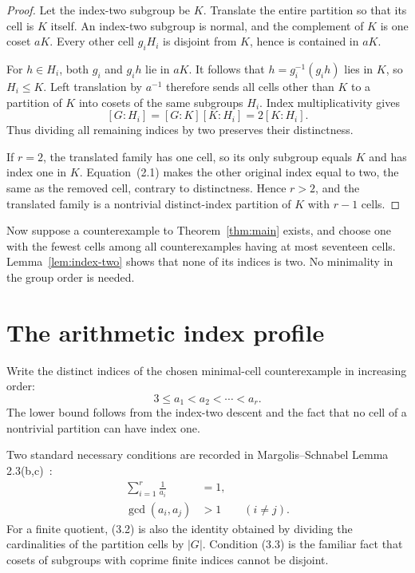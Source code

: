 \documentclass[11pt]{article}
\theoremstyle{definition}
\begin{document}
\begin{proof}
Let the index-two subgroup be $K$. Translate the entire partition so that its
cell is $K$ itself. An index-two subgroup is normal, and the complement of
$K$ is one coset $aK$. Every other cell $g_iH_i$ is disjoint from $K$, hence
is contained in $aK$.

For $h\in H_i$, both $g_i$ and $g_ih$ lie in $aK$. It follows that
$h=g_i^{-1}(g_ih)$ lies in $K$, so $H_i\leq K$. Left translation by $a^{-1}$
therefore sends all cells other than $K$ to a partition of $K$ into cosets of
the same subgroups $H_i$. Index multiplicativity gives
\[
  [G:H_i]=[G:K][K:H_i]=2[K:H_i].
  \tag{2.1}
\]
Thus dividing all remaining indices by two preserves their distinctness.

If $r=2$, the translated family has one cell, so its only subgroup equals
$K$ and has index one in $K$. Equation~(2.1) makes the other original index
equal to two, the same as the removed cell, contrary to distinctness. Hence
$r>2$, and the translated family is a nontrivial distinct-index partition of
$K$ with $r-1$ cells.
\end{proof}

Now suppose a counterexample to Theorem~\ref{thm:main} exists, and choose one
with the fewest cells among all counterexamples having at most seventeen cells.
Lemma~\ref{lem:index-two} shows that none of its indices is two. No minimality
in the group order is needed.

\section{The arithmetic index profile}\label{sec:profile}

Write the distinct indices of the chosen minimal-cell counterexample in
increasing order:
\[
  3\leq a_1<a_2<\cdots<a_r.
  \tag{3.1}
\]
The lower bound follows from the index-two descent and the fact that no cell
of a nontrivial partition can have index one.

Two standard necessary conditions are recorded in
Margolis--Schnabel Lemma 2.3(b,c)~\cite{MS19}:
\begin{align}
  \sum_{i=1}^r\frac1{a_i}&=1, \tag{3.2}\\
  \gcd(a_i,a_j)&>1 \qquad(i\ne j). \tag{3.3}
\end{align}
For a finite quotient, (3.2) is also the identity obtained by dividing the
cardinalities of the partition cells by $|G|$. Condition (3.3) is the familiar
fact that cosets of subgroups with coprime finite indices cannot be disjoint.
\end{document}
